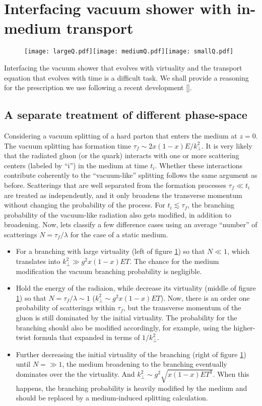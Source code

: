 \section{Interfacing vacuum shower with in-medium transport}
\begin{figure}
\texttt{[image: largeQ.pdf]}\texttt{[image: mediumQ.pdf]}\texttt{[image: smallQ.pdf]}
\caption{}
\label{fig:vac-med-interface}
\end{figure}
Interfacing the vacuum shower that evolves with virtuality and the transport equation that evolves with time is a difficult task. 
We shall provide a reasoning for the prescription we use following a recent development [].

\subsection{A separate treatment of different phase-space}
Considering a vacuum splitting of a hard parton that enters the medium at $z=0$.
The vacuum splitting has formation time $\tau_f \sim 2x(1-x)E/k_\perp^2$.
It is very likely that the radiated gluon (or the quark) interacts with one or more scattering centers (labeled by ``i'') in the medium at time $t_i$.
Whether these interactions contribute coherently to the ``vacuum-like'' splitting follows the same argument as before.
Scatterings that are well separated from the formation processes $\tau_f \ll t_i$ are treated as independently, and it only broadens the transverse momentum without changing the probability of the process.
For $t_i \lesssim \tau_f$, the branching probability of the vacuum-like radiation also gets modified, in addition to broadening.
Now, lets classify a few difference cases using an average ``number'' of scatterings  $N = \tau_f/\lambda$ for the case of a static medium.
\begin{itemize}
\item For a branching with large virtuality (left of figure \ref{fig:vac-med-interface}) so that $N \ll 1$, which translates into $k_\perp^2 \gg  g^2 x(1-x)E T$. 
The chance for the medium modification the vacuum branching probability is negligible. 
\item Hold the energy of the radiaion, while decrease its virtuality (middle of figure \ref{fig:vac-med-interface}) so that $N = \tau_f/\lambda \sim 1$ ($k_\perp^2 \sim g^2 x(1-x)E T$). 
Now, there is an order one probability of scatterings within $\tau_f$, but the transverse momentum of the gluon is still dominated by the initial virtuality.
The probability for the branching should also be modified accordingly, for example, using the higher-twist formula that expanded in terms of $1/k_\perp^2$.
\item Further decreasing the initial virtuality of the branching (right of figure \ref{fig:vac-med-interface}) until $N = \gg 1$,
the medium broadening to the branching eventually dominates over the the virtuality.
And $k_\perp^2 \sim g^2\sqrt{x(1-x)E T^3}$. 
When this happens, the branching probability is heavily modified by the medium and should be replaced by a medium-induced splitting calculation.
\end{itemize}
